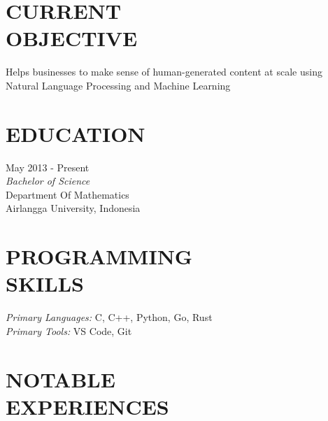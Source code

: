 \documentclass[margin, 10pt]{res} %
\begin{document}
\begin{resume}

 \section{CURRENT\\OBJECTIVE}

Helps businesses to make sense of human-generated content at scale using Natural Language Processing
and Machine Learning


\section{EDUCATION}

May 2013 - Present \\
{\sl Bachelor of Science} \\
Department Of Mathematics \\
Airlangga University, Indonesia


\section{PROGRAMMING\\ SKILLS}

{\sl Primary Languages:} C, C++, Python, Go, Rust \\
{\sl Primary Tools:} VS Code, Git


\section{NOTABLE\\EXPERIENCES}


\end{resume}
\end{document}
